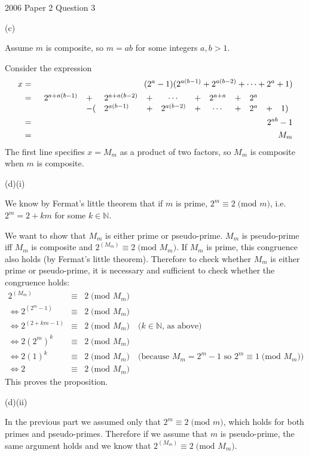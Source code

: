 \documentclass{article}
\begin{document}
2006 Paper 2 Question 3

(c)

Assume $m$ is composite, so $m=ab$ for some integers $a,b>1$.

Consider the expression
\begin{eqnarray}
x &=& (2^a - 1)(2^{a(b-1)} + 2^{a(b-2)} + \cdots + 2^a + 1)\nonumber\\
&=& \begin{array}[t]{lllccccclcl}
2^{a+a(b-1)} &+& 2^{a+a(b-2)} &+& \cdots &+& 2^{a+a} &+& 2^a \\
& -( & 2^{a(b-1)} &+& 2^{a(b-2)} &+& \cdots &+& 2^a &+& 1) \\
\end{array}\nonumber\\
&=& 2^{ab} - 1 \nonumber\\
&=& M_m \nonumber
\end{eqnarray}
The first line specifies $x=M_m$ as a product of two factors, so $M_m$ is
composite when $m$ is composite.

(d)(i)

We know by Fermat's little theorem that if $m$ is prime,
$2^m \equiv 2 \;\mbox{(mod $m$)}$, i.e.
$2^m = 2 + km$ for some $k \in \mathbb{N}$.

We want to show that $M_m$ is either prime or pseudo-prime. $M_m$ is pseudo-prime
iff $M_m$ is composite and $2^{(M_m)} \equiv 2 \;\mbox{(mod $M_m$)}$. 
If $M_m$ is prime, this congruence also holds (by Fermat's little theorem).
Therefore to check whether $M_m$ is either prime or pseudo-prime, it is necessary
and sufficient to check whether the congruence holds:
\begin{eqnarray*}
2^{(M_m)} &\equiv& 2 \;\mbox{(mod $M_m$)} \\
\iff 2^{(2^m - 1)} &\equiv& 2 \;\mbox{(mod $M_m$)} \\
\iff 2^{(2 + km - 1)} &\equiv& 2 \;\mbox{(mod $M_m$)} \quad
\mbox{($k \in \mathbb{N}$, as above)} \\
\iff 2 (2^m)^k &\equiv& 2 \;\mbox{(mod $M_m$)} \\
\iff 2 (1)^k &\equiv& 2 \;\mbox{(mod $M_m$)} \quad
\mbox{(because $M_m = 2^m - 1$ so $2^m \equiv 1 \;\mbox{(mod $M_m$)}$)}\\
\iff 2 &\equiv& 2 \;\mbox{(mod $M_m$)}
\end{eqnarray*}
This proves the proposition.

(d)(ii)

In the previous part we assumed only that $2^m \equiv 2 \;\mbox{(mod $m$)}$,
which holds for both primes and pseudo-primes. Therefore if we assume that
$m$ is pseudo-prime, the same argument holds and we know that
$2^{(M_m)} \equiv 2 \;\mbox{(mod $M_m$)}$.
\end{document}
